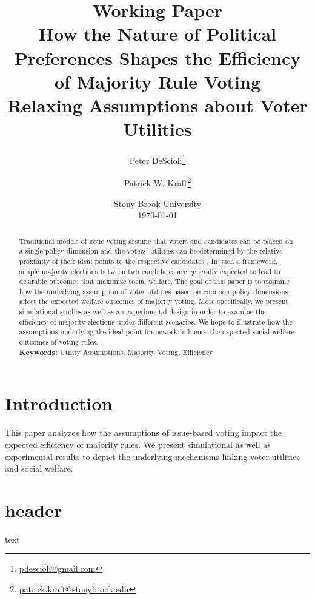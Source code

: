 \documentclass[12pt]{article}
\author{Peter DeScioli\thanks{\href{mailto:pdescioli@gmail.com}{pdescioli@gmail.com}} \and
		Patrick W. Kraft\thanks{\href{mailto:patrick.kraft@stonybrook.edu}{patrick.kraft@stonybrook.edu}} }
\title{{\small Working Paper}\\
How the Nature of Political Preferences Shapes the Efficiency of Majority Rule Voting \\
{\large Relaxing Assumptions about Voter Utilities}}
\date{Stony Brook University \vspace{1cm}\\ \today}
\begin{document}
\maketitle

\begin{abstract}\onehalfspacing
Traditional models of issue voting assume that voters and candidates can be placed on a single policy dimension and the voters' utilities can be determined by the relative proximity of their ideal points to the respective candidates \citep[c.f.][]{downs1957economic}. In such a framework, simple majority elections between two candidates are generally expected to lead to desirable outcomes that maximize social welfare. The goal of this paper is to examine how the underlying assumption of voter utilities based on common policy dimensions affect the expected welfare outcomes of majority voting. More specifically, we present simulational studies as well as an experimental design in order to examine the efficiency of majority elections under different scenarios. We hope to illustrate how the assumptions underlying the ideal-point framework influence the expected social welfare outcomes of voting rules.
\vspace{0.5cm}\\
\textbf{Keywords:} Utility Assumptions, Majority Voting, Efficiency

\end{abstract}

\newpage
\doublespacing

\section{Introduction}

This paper analyzes how the assumptions of issue-based voting impact the expected efficiency of majority rules. We present simulational as well as experimental results to depict the underlying mechanisms linking voter utilities and social welfare.


\section{header}

text


\clearpage



\end{document}

